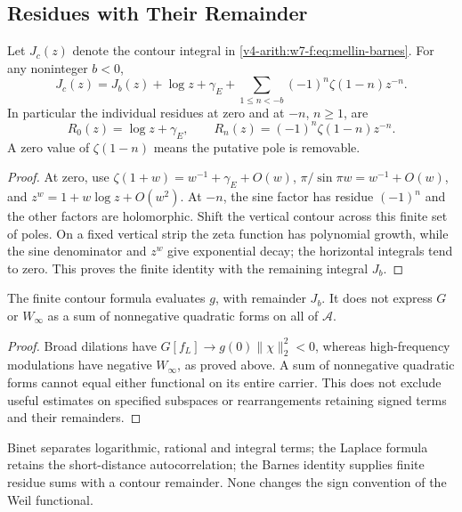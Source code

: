 \subsection{Residues with Their Remainder}
\label{v4-arith:w7-f:mellin-barnes:residues}
\begin{proposition}
\label{v4-arith:w7-f:prop:residue-series}
Let \(J_c(z)\) denote the contour integral in
\eqref{v4-arith:w7-f:eq:mellin-barnes}. For any noninteger \(b<0\),
\begin{equation}
\label{v4-arith:w7-f:eq:residue-series}
 J_c(z)=J_b(z)+\log z+\gamma_E+
 \sum_{1\le n<-b}(-1)^n\zeta(1-n)z^{-n}.
\end{equation}
In particular the individual residues at zero and at \(-n\), \(n\ge1\), are
\begin{equation}
\label{v4-arith:w7-f:eq:R-n}
 R_0(z)=\log z+\gamma_E,\qquad
 R_n(z)=(-1)^n\zeta(1-n)z^{-n}.
\end{equation}
A zero value of \(\zeta(1-n)\) means the putative pole is removable.
\end{proposition}
\begin{proof}
At zero, use \(\zeta(1+w)=w^{-1}+\gamma_E+O(w)\),
\(\pi/\sin\pi w=w^{-1}+O(w)\), and \(z^w=1+w\log z+O(w^2)\).
At \(-n\), the sine factor has residue \((-1)^n\) and the other
factors are holomorphic. Shift the vertical contour across this
finite set of poles. On a fixed vertical strip the zeta function
has polynomial growth, while the sine denominator and \(z^w\)
give exponential decay; the horizontal integrals tend to zero.
This proves the finite identity with the remaining integral \(J_b\).
\end{proof}
\begin{theorem}
\label{v4-arith:w7-f:thm:alternation-obstruction}
The finite contour formula evaluates \(g\), with remainder \(J_b\).
It does not express \(G\) or \(W_\infty\) as a sum of nonnegative
quadratic forms on all of \(\mathscr A\).
\end{theorem}
\begin{proof}
Broad dilations have \(G[f_L]\to g(0)\|\chi\|_2^2<0\), whereas
high-frequency modulations have negative \(W_\infty\), as proved
above. A sum of nonnegative quadratic forms cannot equal either
functional on its entire carrier. This does not exclude useful
estimates on specified subspaces or rearrangements retaining signed
terms and their remainders.
\end{proof}
\begin{remark}
\label{v4-arith:w7-f:rem:mellin-barnes-obstruction}
Binet separates logarithmic, rational and integral terms; the
Laplace formula retains the short-distance autocorrelation; the
Barnes identity supplies finite residue sums with a contour
remainder. None changes the sign convention of the Weil functional.
\end{remark}

